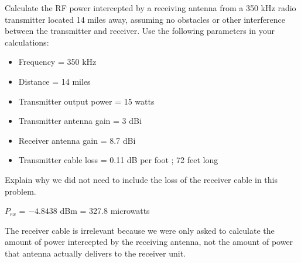 

Calculate the RF power intercepted by a receiving antenna from a 350 kHz radio transmitter located 14 miles away, assuming no obstacles or other interference between the transmitter and receiver.  Use the following parameters in your calculations:

\begin{itemize}
\item{} Frequency = 350 kHz
\item{} Distance = 14 miles
\item{} Transmitter output power = 15 watts
\item{} Transmitter antenna gain = 3 dBi
\item{} Receiver antenna gain = 8.7 dBi
\item{} Transmitter cable loss = 0.11 dB per foot ; 72 feet long
\end{itemize}

Explain why we did not need to include the loss of the receiver cable in this problem.







$P_{rx}$ = $-4.8438$ dBm = 327.8 microwatts

\vskip 10pt

The receiver cable is irrelevant because we were only asked to calculate the amount of power intercepted by the receiving antenna, not the amount of power that antenna actually delivers to the receiver unit.











